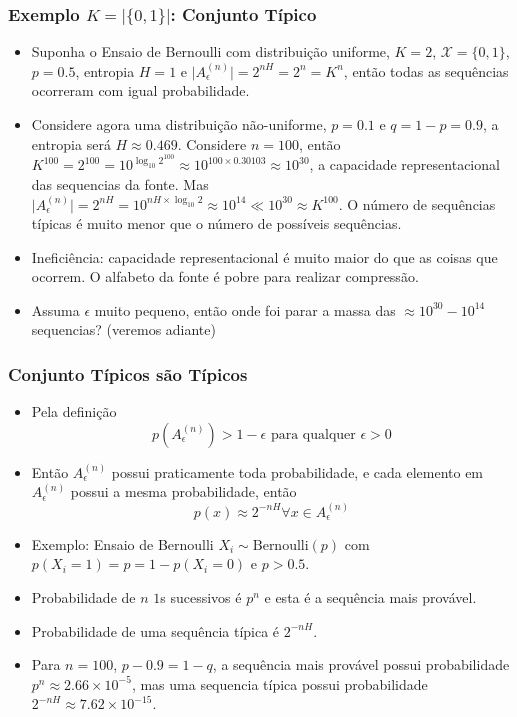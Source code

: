 \begin{frame}%
  \frametitle{Exemplo $K=\vert \{0,1\} \vert$: Conjunto Típico}
  \begin{itemize}
  \item Suponha o Ensaio de Bernoulli com distribuição uniforme, $K=2$, 
        $\mathcal{X} = \{0,1\}$, $p=0.5$, entropia $H=1$ e
        $\vert A_\epsilon^{(n)} \vert = 2^{nH} = 2^n = K^n$, 
        então todas as sequências ocorreram com igual probabilidade.
  \item Considere agora uma distribuição não-uniforme, $p=0.1$ e $q=1-p=0.9$, a entropia será
        $H\approx 0.469$. Considere $n=100$, então 
        $K^{100} = 2^{100} = 10^{\log_{10} 2^{100}} \approx 10^{100 \times 0.30103} \approx 10^{30}$,
        a capacidade representacional das sequencias da fonte. 
        Mas $\vert A_\epsilon^{(n)} \vert = 2^{nH} = 10^{nH \times \log_{10} 2} \approx 10^{14} \ll 10^{30} \approx K^{100}$. 
        O número de sequências típicas é muito menor que o número de possíveis sequências.
  \item Ineficiência: capacidade representacional é muito maior do que as coisas que ocorrem.
        O alfabeto da fonte é pobre para realizar compressão.
  \item Assuma $\epsilon$ muito pequeno, então onde foi parar a massa das $\approx 10^{30} - 10^{14}$ 
        sequencias? (veremos adiante)
  \end{itemize}
\end{frame}

\begin{frame}%
  \frametitle{Conjunto Típicos são Típicos}
  \begin{itemize}
  \item Pela definição
        \begin{equation}
        p(A_\epsilon^{(n)}) > 1 - \epsilon \text{ para qualquer } \epsilon > 0
        \end{equation}
  \item Então $A_\epsilon^{(n)}$ possui praticamente toda probabilidade, e cada elemento
        em $A_\epsilon^{(n)}$ possui a mesma probabilidade, então
        \begin{equation}
        p(x) \approx 2^{-nH} \forall x \in A_\epsilon^{(n)}
        \end{equation}
  \item Exemplo: Ensaio de Bernoulli $X_i \sim \text{Bernoulli}(p)$ com 
        $p(X_i = 1) = p = 1 - p(X_i = 0)$ e $p>0.5$.
  \item Probabilidade de $n$ $1$s sucessivos é $p^n$ e esta é a sequência mais provável.
  \item Probabilidade de uma sequência típica é $2^{-nH}$.
  \item Para $n=100$, $p-0.9 = 1 - q$, a sequência mais provável possui probabilidade
        $p^n \approx 2.66 \times 10^{-5}$, mas uma sequencia típica possui probabilidade
        $2^{-nH} \approx 7.62 \times 10^{-15}$.
  \end{itemize}
\end{frame}


